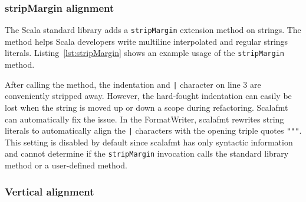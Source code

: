 \subsubsection{stripMargin alignment}
The Scala standard library adds a \texttt{stripMargin} extension method on strings.
The method helps Scala developers write multiline interpolated and regular strings literals.
Listing~\ref{lst:stripMargin} shows an example usage of the \texttt{stripMargin} method.

After calling the method, the indentation and \texttt{|} character on line 3 are conveniently stripped away.
However, the hard-fought indentation can easily be lost when the string is moved up or down a scope during refactoring.
Scalafmt can automatically fix the issue.
In the FormatWriter, scalafmt rewrites string literals to automatically align the \texttt{|} characters with the opening triple quotes \texttt{"""}.
This setting is disabled by default since scalafmt has only syntactic information and cannot determine if the \texttt{stripMargin} invocation calls the standard library method or a user-defined method.

\subsubsection{Vertical alignment}

